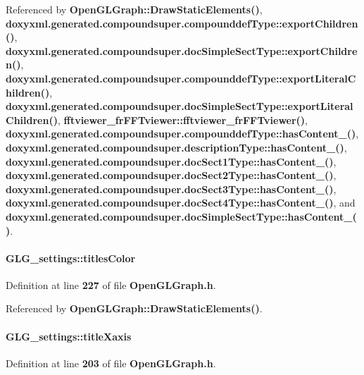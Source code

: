 Referenced by {\bf Open\+G\+L\+Graph\+::\+Draw\+Static\+Elements()}, {\bf doxyxml.\+generated.\+compoundsuper.\+compounddef\+Type\+::export\+Children()}, {\bf doxyxml.\+generated.\+compoundsuper.\+doc\+Simple\+Sect\+Type\+::export\+Children()}, {\bf doxyxml.\+generated.\+compoundsuper.\+compounddef\+Type\+::export\+Literal\+Children()}, {\bf doxyxml.\+generated.\+compoundsuper.\+doc\+Simple\+Sect\+Type\+::export\+Literal\+Children()}, {\bf fftviewer\+\_\+fr\+F\+F\+Tviewer\+::fftviewer\+\_\+fr\+F\+F\+Tviewer()}, {\bf doxyxml.\+generated.\+compoundsuper.\+compounddef\+Type\+::has\+Content\+\_\+()}, {\bf doxyxml.\+generated.\+compoundsuper.\+description\+Type\+::has\+Content\+\_\+()}, {\bf doxyxml.\+generated.\+compoundsuper.\+doc\+Sect1\+Type\+::has\+Content\+\_\+()}, {\bf doxyxml.\+generated.\+compoundsuper.\+doc\+Sect2\+Type\+::has\+Content\+\_\+()}, {\bf doxyxml.\+generated.\+compoundsuper.\+doc\+Sect3\+Type\+::has\+Content\+\_\+()}, {\bf doxyxml.\+generated.\+compoundsuper.\+doc\+Sect4\+Type\+::has\+Content\+\_\+()}, and {\bf doxyxml.\+generated.\+compoundsuper.\+doc\+Simple\+Sect\+Type\+::has\+Content\+\_\+()}.

\paragraph[{titles\+Color}]{ G\+L\+G\+\_\+settings\+::titles\+Color}\label{structGLG__settings_ab142d85e5d4e29dfb12dedff4c91281b}


Definition at line {\bf 227} of file {\bf Open\+G\+L\+Graph.\+h}.



Referenced by {\bf Open\+G\+L\+Graph\+::\+Draw\+Static\+Elements()}.

\paragraph[{title\+Xaxis}]{ G\+L\+G\+\_\+settings\+::title\+Xaxis}\label{structGLG__settings_a09ed2cd8134b97152bdd7c9d656f8ba9}


Definition at line {\bf 203} of file {\bf Open\+G\+L\+Graph.\+h}.



